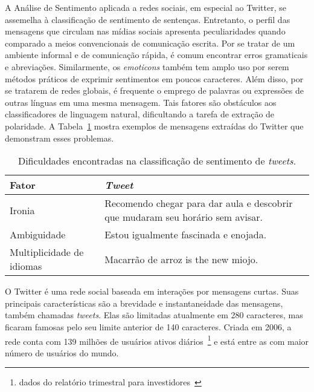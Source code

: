 A Análise de Sentimento aplicada a redes sociais, em especial ao Twitter, se
assemelha à classificação de sentimento de sentenças.
Entretanto, o perfil das mensagens que circulam nas mídias sociais apresenta
peculiaridades quando comparado a meios convencionais de comunicação escrita.
Por se tratar de um ambiente informal e de comunicação rápida, é comum encontrar
erros gramaticais e abreviações.
Similarmente, os \textit{emoticons} também tem amplo uso por serem métodos
práticos de exprimir sentimentos em poucos caracteres.
Além disso, por se tratarem de redes globais, é frequente o emprego de palavras
ou expressões de outras línguas em uma mesma mensagem.
Tais fatores são obstáculos aos classificadores de linguagem natural,
dificultando a tarefa de extração de polaridade.
A Tabela~\ref{tab:sentiment_complexity} mostra exemplos de mensagens extraídas
do Twitter que demonstram esses problemas.

\begin{table}[h]
    \begin{center}
        \begin{tabular}{| l | p{10cm} |}
        \hline
        \textbf{Fator} & \textbf{\textit{Tweet}} \\ \hline
        Ironia & Recomendo chegar para dar aula e descobrir que mudaram seu horário sem avisar. \\ \hline
        Ambiguidade & Estou igualmente fascinada e enojada. \\ \hline
        Multiplicidade de idiomas & Macarrão de arroz is the new miojo. \\ \hline
        \end{tabular}
        \caption{Dificuldades encontradas na classificação de sentimento de
                 \textit{tweets}.}
        \label{tab:sentiment_complexity}
    \end{center}
\end{table}

O Twitter é uma rede social baseada em interações por mensagens curtas.
Suas principais características são a brevidade e instantaneidade das mensagens,
também chamadas \textit{tweets}.
Elas são limitadas atualmente em 280 caracteres, mas ficaram famosas pelo seu
limite anterior de 140 caracteres.
Criada em 2006, a rede conta com 139 milhões de usuários ativos
diários~\footnote{dados do relatório trimestral para
investidores~\cite{twitterreport19}} e está entre
as com maior número de usuários do mundo.

